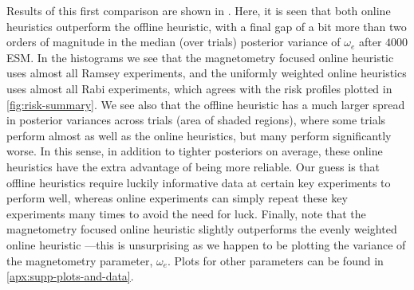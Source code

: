 \documentclass[aps,nofootinbib,twocolumn,superscriptaddress]{revtex4}
\begin{document}
Results of this first comparison 
are shown in .
Here, it is seen that both online heuristics outperform the offline heuristic, with a final 
gap of a bit more than two orders of magnitude in the median (over trials) 
posterior variance of $\omega_e$ after $4000$ ESM.
In the histograms we see that the magnetometry focused online heuristic 
uses almost all Ramsey experiments, and the uniformly weighted online heuristics uses 
almost all Rabi experiments, which agrees with the risk profiles 
plotted in \autoref{fig:risk-summary}.
We see also that the offline heuristic has a much larger spread in posterior 
variances across trials (area of shaded regions),
where some trials perform almost as well as the online heuristics, 
but many perform significantly worse.
In this sense, in addition to tighter posteriors on average, 
these online heuristics have the extra advantage of being 
more reliable.
Our guess is that offline heuristics require luckily informative data at certain key 
experiments to perform well, whereas online experiments can simply repeat these key 
experiments many times to avoid the need for luck.
Finally, note that the magnetometry focused 
online heuristic slightly 
outperforms the evenly weighted online heuristic ---this
is unsurprising as we happen to be plotting the variance of the magnetometry 
parameter, $\omega_e$.
Plots for other parameters can be found in \autoref{apx:supp-plots-and-data}.
\end{document}
